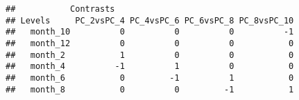 \documentclass[]{article}
\newenvironment{Shaded}{\begin{snugshade}}{\end{snugshade}}
\newcommand{\CommentTok}[1]{\textcolor[rgb]{0.56,0.35,0.01}{\textit{#1}}}
\newcommand{\KeywordTok}[1]{\textcolor[rgb]{0.13,0.29,0.53}{\textbf{#1}}}
\newcommand{\NormalTok}[1]{#1}
\newcommand{\OperatorTok}[1]{\textcolor[rgb]{0.81,0.36,0.00}{\textbf{#1}}}
\begin{document}
\begin{verbatim}
##           Contrasts
## Levels     PC_2vsPC_4 PC_4vsPC_6 PC_6vsPC_8 PC_8vsPC_10
##   month_10          0          0          0          -1
##   month_12          0          0          0           0
##   month_2           1          0          0           0
##   month_4          -1          1          0           0
##   month_6           0         -1          1           0
##   month_8           0          0         -1           1
\end{verbatim}

\begin{Shaded}
\end{Shaded}
\end{document}
